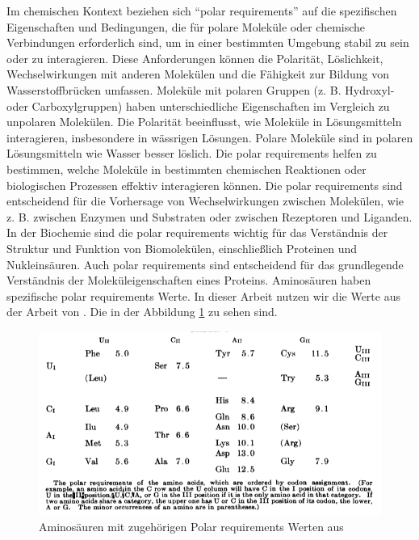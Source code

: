 \documentclass[german,version-2022-01]{uzl-thesis}
\begin{document}
Im chemischen Kontext beziehen sich "`polar requirements"' auf die spezifischen Eigenschaften und Bedingungen, die f\"ur polare Molek\"ule oder chemische Verbindungen erforderlich sind, um in einer bestimmten Umgebung stabil zu sein oder zu interagieren. Diese Anforderungen k\"onnen die Polarit\"at, L\"oslichkeit, Wechselwirkungen mit anderen Molek\"ulen und die F\"ahigkeit zur Bildung von Wasserstoffbr\"ucken umfassen. Molek\"ule mit polaren Gruppen (z. B. Hydroxyl- oder Carboxylgruppen) haben unterschiedliche Eigenschaften im Vergleich zu unpolaren Molek\"ulen. Die Polarit\"at beeinflusst, wie Molek\"ule in L\"osungsmitteln interagieren, insbesondere in w\"assrigen L\"osungen. Polare Molek\"ule sind in polaren L\"osungsmitteln wie Wasser besser l\"oslich. Die polar requirements helfen zu bestimmen, welche Molek\"ule in bestimmten chemischen Reaktionen oder biologischen Prozessen effektiv interagieren k\"onnen. Die polar requirements sind entscheidend f\"ur die Vorhersage von Wechselwirkungen zwischen Molek\"ulen, wie z. B. zwischen Enzymen und Substraten oder zwischen Rezeptoren und Liganden. In der Biochemie sind die polar requirements wichtig f\"ur das Verst\"andnis der Struktur und Funktion von Biomolek\"ulen, einschlie\ss{}lich Proteinen und Nukleins\"auren. Auch polar requirements sind entscheidend f\"ur das grundlegende Verst\"andnis der Molek\"uleigenschaften eines Proteins. 
Aminos\"auren haben spezifische polar requirements Werte. In dieser Arbeit nutzen wir die Werte aus der Arbeit  von \citeauthor{woese_fundamental_1966} \cite{woese_fundamental_1966}. Die in der Abbildung \ref{fig:Polar_requirements_indexe} zu sehen sind. 
\begin{figure}[htpb]
  \centering
  \includegraphics[scale=0.6]{Images/polar_requirements_scores_Paper.png}
  \caption{Aminos\"auren mit zugeh\"origen Polar requirements Werten aus  \cite{woese_fundamental_1966}}
  \label{fig:Polar_requirements_indexe}
\end{figure}
\end{document}
